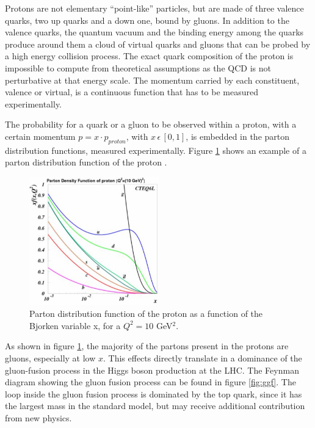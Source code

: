 Protons are not elementary ``point-like'' particles, but are made of three valence quarks, two up quarks and a down one, bound by gluons. In addition to the valence quarks, the quantum vacuum and the binding energy among the quarks produce around them a cloud of virtual quarks and gluons that can be probed by a high energy collision process. The exact quark composition of the proton is impossible to compute from theoretical assumptions as the QCD is not perturbative at that energy scale. The momentum carried by each constituent, valence or virtual, is a continuous function that has to be measured experimentally. 

The probability for a quark or a gluon to be observed within a proton, with a certain momentum $p = x \cdot p_{proton}$, with $x \, \epsilon \, [0,1]$, is embedded in the parton distribution functions, measured experimentally. Figure \ref{fig:pdf} shows an example of a parton distribution function of the proton \cite{Pumplin:2002vw}.

\begin{figure}
\centering
\includegraphics[width=0.5\textwidth]{1_Introduction_Th_and_Exp/pics/pdf.jpg}
\caption{Parton distribution function of the proton as a function of the Bjorken variable x, for a $Q^2=10$ GeV$^2$. }
\label{fig:pdf}
\end{figure}

As shown in figure \ref{fig:pdf}, the majority of the partons present in the protons are gluons, especially at low $x$. This effects directly translate in a dominance of the gluon-fusion process in the Higgs boson production at the LHC. The Feynman diagram showing the gluon fusion process can be found in figure \ref{fig:ggf}. The loop inside the gluon fusion process is dominated by the top quark, since it has the largest mass in the standard model, but may receive additional contribution from new physics. 


